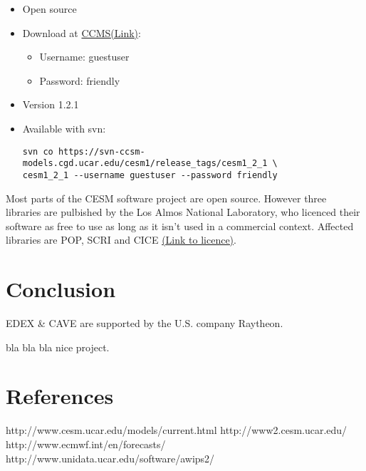 \documentclass[]{article}
\providecommand{\tightlist}{%
  \setlength{\itemsep}{0pt}\setlength{\parskip}{0pt}}
\begin{document}
\begin{itemize}
\item
  Open source
\item
  Download at
  \href{http://www.cesm.ucar.edu/models/cesm1.2/cesm/doc/usersguide/x290.html\#download_ccsm_code}{CCMS(Link)}:

  \begin{itemize}
  \tightlist
  \item
    Username: guestuser
  \item
    Password: friendly
  \end{itemize}
\item
  Version 1.2.1
\item
  Available with svn:

\begin{verbatim}
svn co https://svn-ccsm-models.cgd.ucar.edu/cesm1/release_tags/cesm1_2_1 \
cesm1_2_1 --username guestuser --password friendly
\end{verbatim}
\end{itemize}

Most parts of the CESM software project are open source. However three
libraries are pulbished by the Los Almos National Laboratory, who
licenced their software as free to use as long as it isn't used in a
commercial context. Affected libraries are POP, SCRI and CICE
\href{http://www.cesm.ucar.edu/management/UofCAcopyright.ccsm3.html}{(Link
to licence)}.

\section{Conclusion}\label{conclusion}

EDEX \& CAVE are supported by the U.S. company Raytheon.

bla bla bla nice project.

\section{References}\label{references}

http://www.cesm.ucar.edu/models/current.html http://www2.cesm.ucar.edu/
http://www.ecmwf.int/en/forecasts/
http://www.unidata.ucar.edu/software/awips2/
\end{document}
